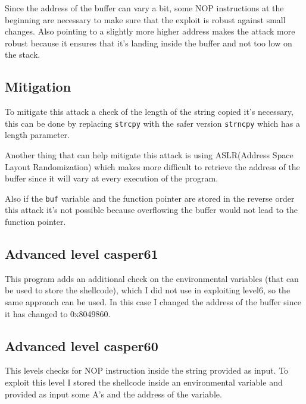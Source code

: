 \documentclass[a4paper,12pt]{article}
\begin{document}
Since the address of the buffer can vary a bit, some NOP instructions at the beginning are necessary to make sure that the exploit is robust against small changes. Also pointing to a slightly more higher address makes the attack more robust because it ensures that it's landing inside the buffer and not too low on the stack.


\subsection{Mitigation}

To mitigate this attack a check of the length of the string copied it's necessary, this can be done by replacing \texttt{strcpy} with the safer version \texttt{strncpy} which has a length parameter.

Another thing that can help mitigate this attack is using ASLR(Address Space Layout Randomization)
which makes more difficult to retrieve the address of the buffer since it will vary at every execution of the program.

Also if the \texttt{buf} variable and the function pointer are stored in the reverse order this attack it's not possible because overflowing the buffer would not lead to the function pointer.

\subsection{Advanced level casper61}

This program adds an additional check on the environmental variables (that can be used to store the shellcode), which I did not use in exploiting level6, so the same approach can be used. In this case I changed the address of the buffer since it has changed to 0x8049860.

\subsection{Advanced level casper60}

This levels checks for NOP instruction inside the string provided as input. To exploit this level I stored the shellcode inside an environmental variable and provided as input some A's and the address of the variable.
\end{document}
